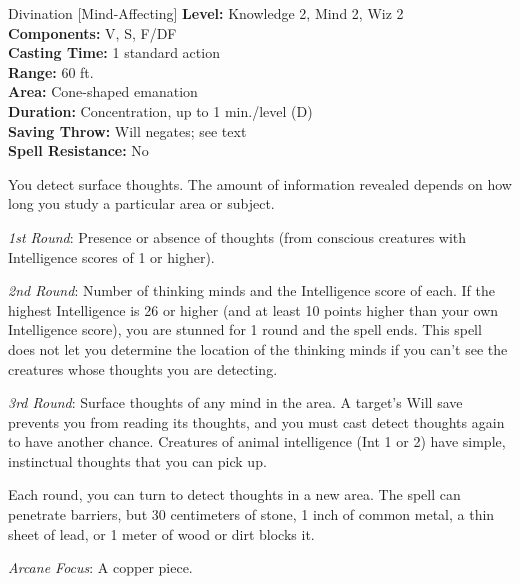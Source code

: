 {Divination [Mind-Affecting]}
{
	\textbf{Level:}
	Knowledge 2, Mind 2, Wiz 2\\
	\textbf{Components:}
	V, S, F/DF\\
	\textbf{Casting Time:}
	1 standard action\\
	\textbf{Range:}
	60 ft.\\
	\textbf{Area:}
	Cone-shaped emanation\\
	\textbf{Duration:}
	Concentration, up to 1 min./level (D)\\
	\textbf{Saving Throw:}
	Will negates; see text\\
	\textbf{Spell Resistance:}
	No\\
}
{
	You detect surface thoughts. The amount of information revealed depends on how long you study a particular area or subject.

	\textit{1st Round}:
	Presence or absence of thoughts (from conscious creatures with Intelligence scores of 1 or higher).

	\textit{2nd Round}:
	Number of thinking minds and the Intelligence score of each. If the highest Intelligence is 26 or higher (and at least 10 points higher than your own Intelligence score), you are stunned for 1 round and the spell ends. This spell does not let you determine the location of the thinking minds if you can't see the creatures whose thoughts you are detecting.

	\textit{3rd Round}:
	Surface thoughts of any mind in the area. A target's Will save prevents you from reading its thoughts, and you must cast detect thoughts again to have another chance. Creatures of animal intelligence (Int 1 or 2) have simple, instinctual thoughts that you can pick up.

	Each round, you can turn to detect thoughts in a new area. The spell can penetrate barriers, but 30 centimeters of stone, 1 inch of common metal, a thin sheet of lead, or 1 meter of wood or dirt blocks it.

	\textit{Arcane Focus}:
	A copper piece.

}
